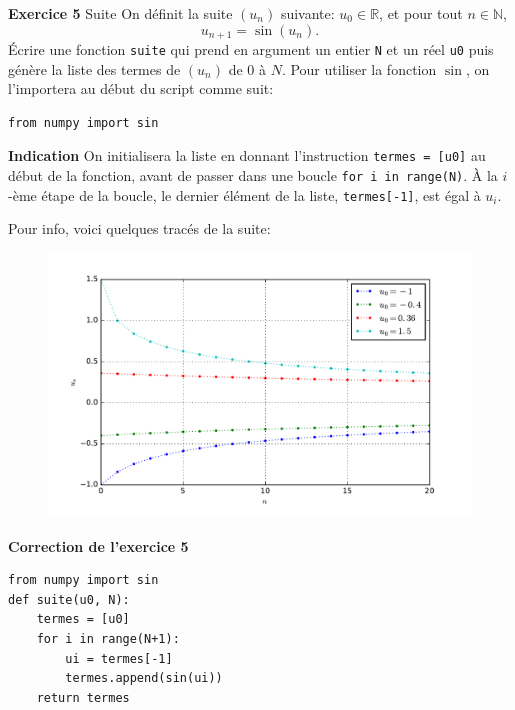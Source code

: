 \documentclass[10pt]{beamer}
\begin{document}
\begin{frame}[fragile]
\begin{block}{\textbf{Exercice 5} Suite}
On définit la suite $(u_n)$ suivante: $u_0\in\mathbb{R}$, et pour tout $n\in\mathbb{N}$, \[u_{n+1} = \sin(u_n).\]
\pause
Écrire une fonction \lstinline|suite| qui prend en argument un entier \lstinline|N| et un réel \lstinline|u0| puis génère la liste des termes de $(u_n)$ de $0$ à $N$.
\pause
Pour utiliser la fonction $\sin$, on l'importera au début du script comme suit:
\begin{lstlisting}
from numpy import sin
\end{lstlisting}
\pause

\textbf{Indication} On initialisera la liste en donnant l'instruction \lstinline|termes = [u0]| au début de la fonction, avant de passer dans une boucle \lstinline|for i in range(N)|. À la  $i$-ème étape de la boucle, le dernier élément de la liste, \lstinline|termes[-1]|, est égal à $u_i$.

\end{block}
\end{frame}

\begin{frame}
Pour info, voici quelques tracés de la suite:
\begin{figure}
\centering
\includegraphics[width=\textwidth]{chope.pdf}
\end{figure}
\end{frame}

\begin{frame}[fragile]
\begin{block}{\textbf{Correction de l'exercice 5}}
\begin{lstlisting}from numpy import sin
def suite(u0, N):
    termes = [u0]
    for i in range(N+1):
        ui = termes[-1]
        termes.append(sin(ui))
    return termes\end{lstlisting}
\end{block}
\end{frame}
\end{document}
